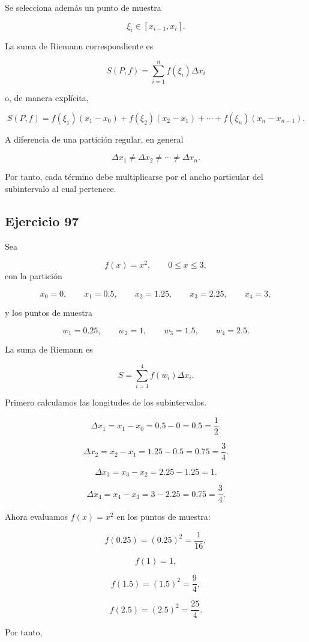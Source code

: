 \documentclass[12pt]{article}
\begin{document}
Se selecciona además un punto de muestra

\[
\xi_i\in[x_{i-1},x_i].
\]

La suma de Riemann correspondiente es

\[
\boxed{
S(P,f)
=
\sum_{i=1}^{n}
f(\xi_i)\Delta x_i
}
\]

o, de manera explícita,

\[
\boxed{
S(P,f)
=
f(\xi_1)(x_1-x_0)
+
f(\xi_2)(x_2-x_1)
+\cdots+
f(\xi_n)(x_n-x_{n-1})
}.
\]

A diferencia de una partición regular, en general

\[
\Delta x_1\neq
\Delta x_2\neq
\cdots\neq
\Delta x_n.
\]

Por tanto, cada término debe multiplicarse por el ancho particular del
subintervalo al cual pertenece.

\subsection*{Ejercicio 97}

Sea

\[
f(x)=x^2,
\qquad
0\leq x\leq 3,
\]
con la partición

\[
x_0=0,\qquad
x_1=0.5,\qquad
x_2=1.25,\qquad
x_3=2.25,\qquad
x_4=3,
\]

y los puntos de muestra

\[
w_1=0.25,\qquad
w_2=1,\qquad
w_3=1.5,\qquad
w_4=2.5.
\]

La suma de Riemann es

\[
S=
\sum_{i=1}^{4}
f(w_i)\Delta x_i.
\]

Primero calculamos las longitudes de los subintervalos.

\[
\Delta x_1
=
x_1-x_0
=
0.5-0
=
0.5
=
\frac12.
\]

\[
\Delta x_2
=
x_2-x_1
=
1.25-0.5
=
0.75
=
\frac34.
\]

\[
\Delta x_3
=
x_3-x_2
=
2.25-1.25
=
1.
\]

\[
\Delta x_4
=
x_4-x_3
=
3-2.25
=
0.75
=
\frac34.
\]

Ahora evaluamos \(f(x)=x^2\) en los puntos de muestra:

\[
f(0.25)
=
(0.25)^2
=
\frac1{16},
\]

\[
f(1)=1,
\]

\[
f(1.5)
=
(1.5)^2
=
\frac94,
\]

\[
f(2.5)
=
(2.5)^2
=
\frac{25}{4}.
\]

Por tanto,
\end{document}
